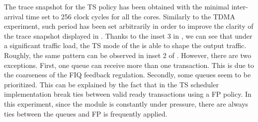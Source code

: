The trace snapshot for the TS policy has been obtained with the
minimal inter-arrival time set to 256 clock cycles for all the
cores. Similarly to the TDMA experiment, such period has been set
arbitrarily in order to improve the clarity of the trace snapshot
displayed in .  Thanks to the inset 3 in
, we can see that under a significant
traffic load, the TS mode of the \schim is able to shape the output
traffic. Roughly, the same pattern can be observed in inset 2 of
. However, there are two
exceptions. First, one queue can receive more than one
transaction. This is due to the coarseness of the FIQ feedback
regulation. Secondly, some queues seem to be prioritized. This can be
explained by the fact that in the TS scheduler implementation break
ties between valid ready transactions using a FP policy. In this
experiment, since the \schim module is constantly under pressure,
there are always ties between the queues and FP is frequently applied.
